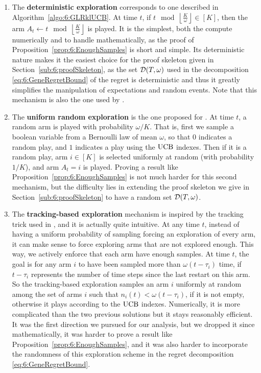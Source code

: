 \begin{enumerate}%
    \item
    The \textbf{deterministic exploration}
    corresponds to one described in Algorithm~\ref{algo:6:GLRklUCB}.
    At time $t$, if $t \mod \left\lfloor \frac{K}{\omega}\right\rfloor \in [K]$, then the arm $A_t \leftarrow t \mod \left\lfloor \frac{K}{\omega}\right\rfloor$ is played.
    It is the simplest, both the compute numerically and to handle mathematically, as the proof of Proposition~\ref{prop:6:EnoughSamples} is short and simple.
    Its deterministic nature makes it the easiest choice for the proof skeleton given in Section~\ref{sub:6:proofSkeleton}, as the set $\mathcal{D}(T,\omega)$ used in the decomposition \eqref{eq:6:GeneRegretBound} of the regret is deterministic and thus it greatly simplifies the manipulation of expectations and random events.
    Note that this mechanism is also the one used by \MUCB{} \cite{CaoZhenKvetonXie18}.

    \item
    The \textbf{uniform random exploration} is the one proposed for \CUSUMUCB{} \cite{LiuLeeShroff17}.
    At time $t$, a random arm is played with probability $\omega/K$. That is, first we sample a boolean variable from a Bernoulli law of mean $\omega$, so that $0$ indicates a random play, and $1$ indicates a play using the $\mathrm{UCB}$ indexes. Then if it is a random play, arm $i\in[K]$ is selected uniformly at random (with probability $1/K$), and arm $A_t = i$ is played.
    Proving a result like Proposition~\ref{prop:6:EnoughSamples} is not much harder for this second mechanism,
    but the difficulty lies in extending the proof skeleton we give in Section~\ref{sub:6:proofSkeleton} to have a random set $\mathcal{D}(T,\omega)$.

    \item
    The \textbf{tracking-based exploration} mechanism is inspired by the tracking trick used in \cite{Garivier16BAI}, and it is actually quite intuitive.
    At any time $t$, instead of having a uniform probability of sampling forcing an exploration of every arm, it can make sense to force exploring arms that are not explored enough. This way, we actively enforce that each arm have enough samples.
    At time $t$, the goal is for any arm $i$ to have been sampled more than $\omega (t - \tau_i)$ time, if $t - \tau_i$ represents the number of time steps since the last restart on this arm.
    So the tracking-based exploration samples an arm $i$ uniformly at random among the set of arms $i$ such that $n_i(t) < \omega (t - \tau_i)$, if it is not empty, otherwise it plays according to the $\mathrm{UCB}$ indexes.
    Numerically, it is more complicated than the two previous solutions but it stays reasonably efficient.
    It was the first direction we pursued for our analysis, but we dropped it since mathematically, it was harder to prove a result like Proposition~\ref{prop:6:EnoughSamples}, and it was also harder to incorporate the randomness of this exploration scheme in the regret decomposition \eqref{eq:6:GeneRegretBound}.
\end{enumerate}

